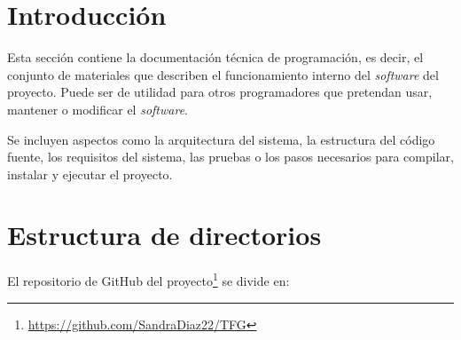 
\section{Introducción}
Esta sección contiene la documentación técnica de programación, es decir, el conjunto de materiales que describen el funcionamiento interno del \textit{software} del proyecto. Puede ser de utilidad para otros programadores que pretendan usar, mantener o modificar el \textit{software}. 

Se incluyen aspectos como la arquitectura del sistema, la estructura del código fuente, los requisitos del sistema, las pruebas o los pasos necesarios para compilar, instalar y ejecutar el proyecto.


\section{Estructura de directorios}
El repositorio de GitHub del proyecto\footnote{\url{https://github.com/SandraDiaz22/TFG}} se divide en:
